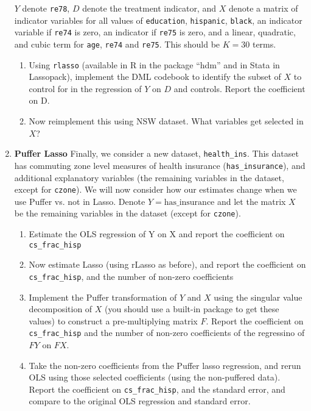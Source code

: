 \documentclass[11pt, a4paper]{article}
\begin{document}
\begin{enumerate}
  $Y$ denote \texttt{re78}, $D$ denote the treatment indicator, and
  $X$ denote a matrix of indicator variables for all values of
  \texttt{education}, \texttt{hispanic}, \texttt{black}, an indicator
  variable if \texttt{re74} is zero, an indicator if \texttt{re75} is
  zero, and a linear, quadratic, and cubic term for \texttt{age},
  \texttt{re74} and \texttt{re75}. This should be $K = 30$ terms. 
  \begin{enumerate}
  \item Using \texttt{rlasso} (available in R in the package ``hdm''
    and in Stata in Lassopack), implement the DML codebook to identify
    the subset of $X$ to control for in the regression of $Y$ on $D$
    and controls. Report the coefficient on D.
  \item Now reimplement this using NSW dataset. What variables get
    selected in $X$?
  \end{enumerate}
\item \textbf{Puffer Lasso} Finally, we consider a new dataset,
  \texttt{health\_ins}. This dataset has commuting zone level measures
  of health insurance (\texttt{has\_insurance}), and additional
  explanatory variables (the remaining variables in the dataset,
  except for \texttt{czone}). We will now consider how our estimates
  change when we use Puffer vs. not in Lasso. Denote
  $Y = \text{has\_insurance}$ and let the matrix $X$ be the remaining
  variables in the dataset (except for \texttt{czone}).
  \begin{enumerate}
  \item Estimate the OLS regression of Y on X and report the coefficient on \texttt{cs\_frac\_hisp}
  \item Now estimate Lasso (using rLasso as before), and report the coefficient on \texttt{cs\_frac\_hisp}, and the number of non-zero coefficients
  \item Implement the Puffer transformation of $Y$ and $X$
    using the singular value decomposition of $X$ (you should use a
    built-in package to get these values) to construct a
    pre-multiplying matrix $F$. Report the coefficient on
    \texttt{cs\_frac\_hisp} and the number of non-zero coefficients of
    the regressino of $FY$ on $FX$.
  \item Take the non-zero coefficients from the Puffer lasso
    regression, and rerun OLS using those selected coefficients (using
    the non-puffered data). Report the coefficient on
    \texttt{cs\_frac\_hisp}, and the standard error, and compare to the
    original OLS regression and standard error.
  \end{enumerate}
\end{enumerate}
\end{document}
